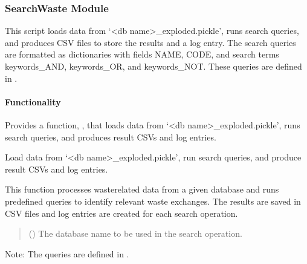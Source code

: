 \documentclass[letterpaper,10pt,english]{sphinxmanual}
\begin{document}
\subsubsection{SearchWaste Module}
\label{\detokenize{WMFootprint_api:searchwaste-module}}
\sphinxAtStartPar
This script loads data from ‘\textless{}db name\textgreater{}\_exploded.pickle’, runs search queries, 
and produces CSV files to store the results and a log entry. The search queries are 
formatted as dictionaries with fields NAME, CODE, and search terms keywords\_AND, 
keywords\_OR, and keywords\_NOT. These queries are defined in .


\paragraph{Functionality}
\label{\detokenize{WMFootprint_api:functionality}}
\sphinxAtStartPar
Provides a function, {\hyperref[\detokenize{WMFootprint_api:WasteAndMaterialFootprint.SearchWaste.SearchWaste}]{}}, that loads data from ‘\textless{}db name\textgreater{}\_exploded.pickle’,
runs search queries, and produces result CSVs and log entries.

\begin{fulllineitems}
\label{\detokenize{WMFootprint_api:WasteAndMaterialFootprint.SearchWaste.SearchWaste}}
\pysigstartsignatures
{}
\pysigstopsignatures
\sphinxAtStartPar
Load data from ‘\textless{}db name\textgreater{}\_exploded.pickle’, run search queries, and produce
result CSVs and log entries.

\sphinxAtStartPar
This function processes waste\sphinxhyphen{}related data from a given database and runs
predefined queries to identify relevant waste exchanges. The results are
saved in CSV files and log entries are created for each search operation.
\begin{quote}\begin{description}
\sphinxAtStartPar
{} () \textendash{} The database name to be used in the search operation.

\end{description}\end{quote}

\sphinxAtStartPar
Note:
The queries are defined in .

\end{fulllineitems}
\end{document}

